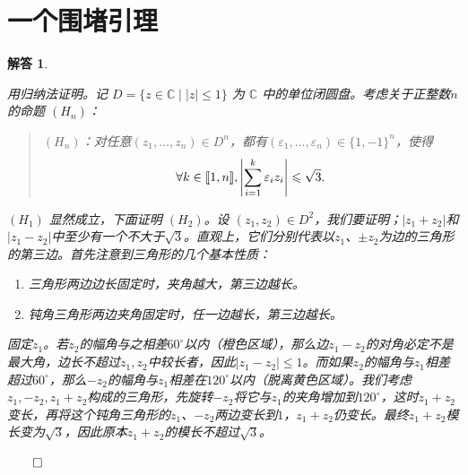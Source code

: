 \documentclass[12pt,UTF8,fontset=none]{ctexbook}
\theoremstyle{exercisestyle}
\theoremstyle{solutionstyle}
\newtheorem*{solution*}{解答}
\newenvironment{solution}
  {\begin{solution*}}
  {\hfill\ensuremath{\qed}\end{solution*}}
\begin{document}
\section{一个围堵引理}
\begin{solution}
\begin{subquestions}
\item 用归纳法证明。记 \( D = \{z \in \mathbb{C} \mid |z| \leqslant 1\} \) 为 \( \mathbb{C} \) 中的单位闭圆盘。考虑关于正整数$n$的命题 \( (H_n) \)：
\begin{quotation}
  $(H_n) $：对任意$(z_1, \ldots, z_n) \in D^n$，都有$(\varepsilon_1, \ldots, \varepsilon_n) \in \{1, -1\}^n$，使得
  $$ \forall k \in [\![1,n]\!], \left| \sum_{i=1}^k \varepsilon_i z_i \right| \leqslant \sqrt{3}. $$
\end{quotation}

\( (H_1) \) 显然成立，下面证明 \( (H_2) \)。设 \( (z_1, z_2) \in D^2 \)，我们要证明；$|z_1 + z_2|$和$|z_1 - z_2|$中至少有一个不大于$\sqrt{3}$。直观上，它们分别代表以$z_1$、$\pm z_2$为边的三角形的第三边。首先注意到三角形的几个基本性质：
\begin{enumerate}[label=\arabic*.]
  \item 三角形两边边长固定时，夹角越大，第三边越长。
  \item 钝角三角形两边夹角固定时，任一边越长，第三边越长。
\end{enumerate}
固定$z_1$。若$z_2$的幅角与之相差$60^\circ$以内（橙色区域），那么边$z_1 - z_2$的对角必定不是最大角，边长不超过$z_1,z_2$中较长者，因此$|z_1 - z_2| \leqslant 1$。而如果$z_2$的幅角与$z_1$相差超过$60^\circ$，那么$-z_2$的幅角与$z_1$相差在$120^\circ$以内（脱离黄色区域）。我们考虑$z_1, -z_2, z_1 + z_2$构成的三角形，先旋转$-z_2$将它与$z_1$的夹角增加到$120^\circ$，这时$z_1+z_2$变长，再将这个钝角三角形的$z_1$、$-z_2$两边变长到$1$，$z_1+z_2$仍变长。最终$z_1+z_2$模长变为$\sqrt{3}$，因此原本$z_1 + z_2$的模长不超过$\sqrt{3}$。

\begin{minipage}[t]{0.4\textwidth}
\centering
\end{minipage}
\end{subquestions}
\end{solution}
\end{document}
